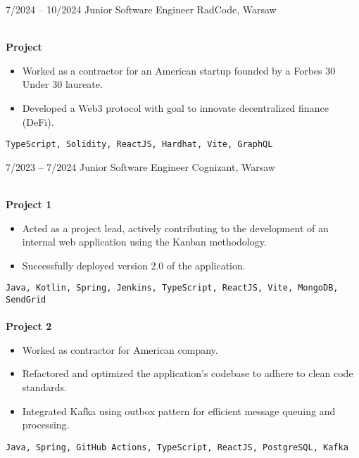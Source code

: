\documentclass[9pt]{developercv} %
\begin{document}
\vspace{-5 pt}
\begin{entrylist}
    \entry
        {7/2024 -- 10/2024}
		{Junior Software Engineer}
		{RadCode, Warsaw}
		{\\
        \textbf{\small Project}\\
        \vspace{-10pt}
        \begin{itemize}[noitemsep,topsep=0pt,parsep=0pt,partopsep=0pt, leftmargin=-1pt]
            \item Worked as a contractor for an American startup founded by a Forbes 30 Under 30 laureate.
            \item Developed a Web3 protocol with goal to innovate decentralized finance (DeFi).
        \end{itemize}
        \vspace{2mm}
        \texttt{TypeScript, Solidity, ReactJS, Hardhat, Vite, GraphQL}
        }
	\entry
        {7/2023 -- 7/2024}
		{Junior Software Engineer}
		{Cognizant, Warsaw}
		{\\
        \textbf{\small Project 1}\\
        \vspace{-10pt}
        \begin{itemize}[noitemsep,topsep=0pt,parsep=0pt,partopsep=0pt, leftmargin=-1pt]
            \item Acted as a project lead, actively contributing to the development of an internal web application using the Kanban methodology.
            \item Successfully deployed version 2.0 of the application.
        \end{itemize}
        \vspace{2mm}
        \texttt{Java, Kotlin, Spring, Jenkins, TypeScript, ReactJS, Vite, MongoDB, SendGrid}
        \\\\
        \textbf{\small Project 2}\\
        \vspace{-10pt}
        \begin{itemize}[noitemsep,topsep=0pt,parsep=0pt,partopsep=0pt, leftmargin=-1pt]
            \item Worked as contractor for American company.
            \item Refactored and optimized the application's codebase to adhere to clean code standards.
            \item Integrated Kafka using outbox pattern for efficient message queuing and processing.
        \end{itemize}
        \vspace{2mm}
        \texttt{Java, Spring, GitHub Actions, TypeScript, ReactJS, PostgreSQL, Kafka}}

\end{entrylist}
\end{document}
